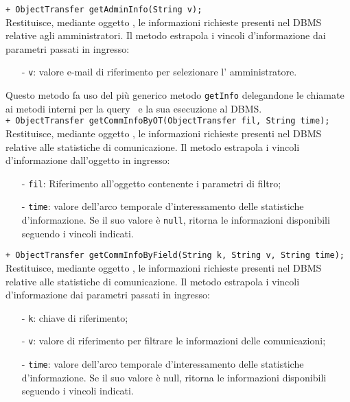 {\begin{sloppypar}
{{{{\begin{itemize}
{				\texttt{+ ObjectTransfer getAdminInfo(String v);}\\
				Restituisce, mediante oggetto , le informazioni richieste presenti nel DBMS\g~ relative agli amministratori. Il metodo estrapola i vincoli d'informazione dai parametri passati in ingresso:
				\begin{itemize}
					\item[-] \texttt{v}: valore e-mail di riferimento per selezionare l' amministratore.
				\end{itemize}
				Questo metodo fa uso del più generico metodo \texttt{getInfo} delegandone le chiamate ai metodi interni per la query\g~ e la sua esecuzione al DBMS\g.\\
				
				\texttt{+ ObjectTransfer getCommInfoByOT(ObjectTransfer fil, String time);}\\
				Restituisce, mediante oggetto , le informazioni richieste presenti nel DBMS\g~ relative alle statistiche di comunicazione. Il metodo estrapola i vincoli d'informazione dall'oggetto in ingresso:
				\begin{itemize}
					\item[-] \texttt{fil}: Riferimento all'oggetto  contenente i parametri di filtro;
					\item[-] \texttt{time}: valore dell'arco temporale d'interessamento delle statistiche d'informazione. Se il suo valore è \texttt{null}, ritorna le informazioni disponibili seguendo i vincoli indicati.\\
				\end{itemize}
				
				\texttt{+ ObjectTransfer getCommInfoByField(String k, String v, String time);}\\
				Restituisce, mediante oggetto , le informazioni richieste presenti nel DBMS\g~ relative alle statistiche di comunicazione. Il metodo estrapola i vincoli d'informazione dai parametri passati in ingresso:
				\begin{itemize}
					\item[-] \texttt{k}: chiave di riferimento;
					\item[-] \texttt{v}: valore di riferimento per filtrare le informazioni delle comunicazioni;
					\item[-] \texttt{time}: valore dell'arco temporale d'interessamento delle statistiche d'informazione. Se il suo valore è  null, ritorna le informazioni disponibili seguendo i vincoli indicati.\\
				\end{itemize}
				
}
\end{itemize}}}}}
\end{sloppypar}}
